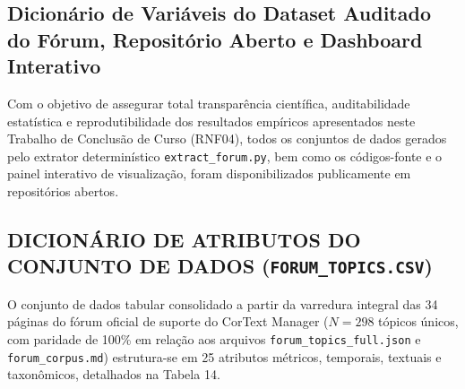 \documentclass[
	oneside,
	a4paper,
	12pt,
	chapter=TITLE,
	section=TITLE,
	english,
	brazilian
]{abntex2}
\begin{document}
\begin{apendicesenv}
\chapter{Dicionário de Variáveis do Dataset Auditado do Fórum, Repositório Aberto e Dashboard Interativo}\label{sec:dicionario_de_variaveis_do_dataset_audit}


Com o objetivo de assegurar total transparência científica, auditabilidade estatística e reprodutibilidade dos resultados empíricos apresentados neste Trabalho de Conclusão de Curso (RNF04), todos os conjuntos de dados gerados pelo extrator determinístico \texttt{extract\_\allowbreak forum.\allowbreak py}, bem como os códigos-fonte e o painel interativo de visualização, foram disponibilizados publicamente em repositórios abertos.

\FloatBarrier
\section{DICIONÁRIO DE ATRIBUTOS DO CONJUNTO DE DADOS (\texttt{FORUM\_\allowbreak TOPICS.\allowbreak CSV})}\label{sec:dicionario_de_atributos_do_conjunto_de_d}


O conjunto de dados tabular consolidado a partir da varredura integral das 34 páginas do fórum oficial de suporte do CorText Manager ($N = 298$ tópicos únicos, com paridade de 100\% em relação aos arquivos \texttt{forum\_\allowbreak topics\_\allowbreak full.\allowbreak json} e \texttt{forum\_\allowbreak corpus.\allowbreak md}) estrutura-se em 25 atributos métricos, temporais, textuais e taxonômicos, detalhados na Tabela 14.


\end{apendicesenv}
\end{document}
